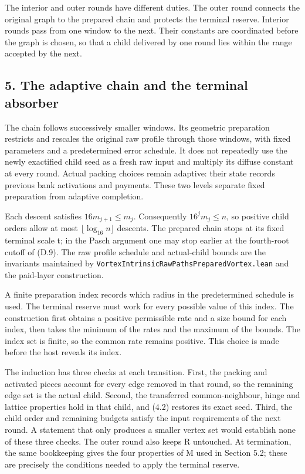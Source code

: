 \documentclass[english,11pt,a4paper]{article}
\newcounter{none}
\begin{document}
The interior and outer rounds have different duties. The outer round connects the original graph to the prepared chain and protects the terminal reserve. Interior rounds pass from one window to the next. Their constants are coordinated before the graph is chosen, so that a child delivered by one round lies within the range accepted by the next.

\subsection{5. The adaptive chain and the terminal absorber}\label{the-adaptive-chain-and-the-terminal-absorber}

The chain follows successively smaller windows. Its geometric preparation restricts and rescales the original raw profile through those windows, with fixed parameters and a predetermined error schedule. It does not repeatedly use the newly exactified child seed as a fresh raw input and multiply its diffuse constant at every round. Actual packing choices remain adaptive: their state records previous bank activations and payments. These two levels separate fixed preparation from adaptive completion.

Each descent satisfies \(16m_{j+1}\leq m_j\). Consequently \(16^jm_j\leq n\), so positive child orders allow at most \(\lfloor\log_{16}n\rfloor\) descents. The prepared chain stops at its fixed terminal scale t; in the Pasch argument one may stop earlier at the fourth-root cutoff of (D.9). The raw profile schedule and actual-child bounds are the invariants maintained by \texttt{Vortex\allowbreak{}Intrinsic\allowbreak{}Raw\allowbreak{}Paths\allowbreak{}Prepared\allowbreak{}Vortex.\allowbreak{}lean} and the paid-layer construction.

A finite preparation index records which radius in the predetermined schedule is used. The terminal reserve must work for every possible value of this index. The construction first obtains a positive permissible rate and a size bound for each index, then takes the minimum of the rates and the maximum of the bounds. The index set is finite, so the common rate remains positive. This choice is made before the host reveals its index.

The induction has three checks at each transition. First, the packing and activated pieces account for every edge removed in that round, so the remaining edge set is the actual child. Second, the transferred common-neighbour, hinge and lattice properties hold in that child, and (4.2) restores its exact seed. Third, the child order and remaining budgets satisfy the input requirements of the next round. A statement that only produces a smaller vertex set would establish none of these three checks. The outer round also keeps R untouched. At termination, the same bookkeeping gives the four properties of M used in Section 5.2; these are precisely the conditions needed to apply the terminal reserve.
\end{document}
